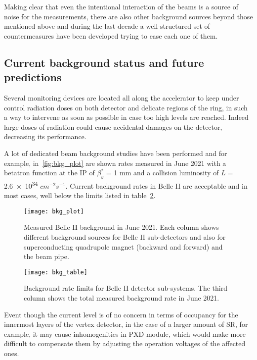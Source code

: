 Making clear that even the intentional interaction of the beams is a source of noise for the measurements, there are also other background sources beyond those mentioned above and during the last decade a well-structured set of countermeasures have been developed trying to ease each one of them.


\subsection{Current background status and future predictions}\label{sec:bkg_predictions}

Several monitoring devices are located all along the accelerator to keep under control radiation doses on both detector and delicate regions of the ring, in such a way to intervene as soon as possible in case too high levels are reached. Indeed large doses of radiation could cause accidental damages on the detector, decreasing its performance.

A lot of dedicated beam background studies have been performed and for example, in~\autoref{fig:bkg_plot} are shown rates measured in June 2021 with a betatron function at the IP of $\beta_{y}^{*}$ = 1 mm and a collision luminosity of \textit{L} = \num{2.6e34} $cm^{-2} s^{-1}$. Current background rates in Belle II are acceptable and in most cases, well below the limits listed in table~\ref{fig:bkg_table}.\\

\begin{figure}[h!]
\centering
\texttt{[image: bkg\_plot]}
\caption{Measured Belle II background in June 2021. Each column shows different background sources for Belle II sub-detectors and also for superconducting quadrupole magnet (backward and forward) and the beam pipe.}
\label{fig:bkg_plot}
\end{figure}


\begin{figure}[h!]
\centering
\texttt{[image: bkg\_table]}
\caption{Background rate limits for Belle II detector sub-systems. The third column shows the total measured background rate in June 2021.}
\label{fig:bkg_table}
\end{figure}

Event though the current level is of no concern in terms of occupancy for the innermost layers of the vertex detector, in the case of a larger amount of SR, for example, it may cause inhomogenities in PXD module, which would make more difficult to compensate them by adjusting the operation voltages of the affected ones.\\

